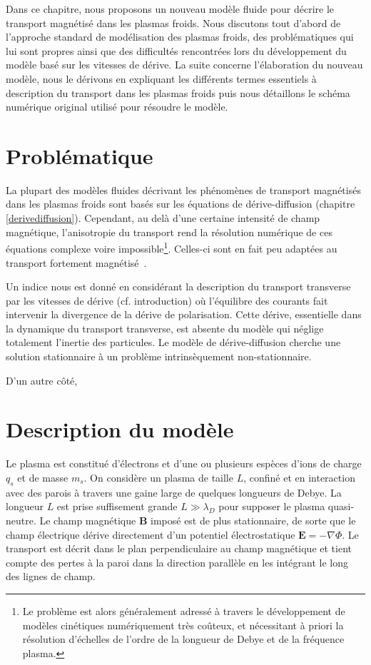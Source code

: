\begin{refsection}


Dans ce chapitre, nous proposons un nouveau modèle fluide pour décrire le
transport magnétisé dans les plasmas froids. Nous discutons tout d'abord de
l'approche standard de modélisation des plasmas froids, des problématiques qui
lui sont propres ainsi que des difficultés rencontrées lors du développement du
modèle basé sur les vitesses de dérive. La suite concerne l'élaboration du
nouveau modèle, nous le dérivons en expliquant les différents termes essentiels
à description du transport dans les plasmas froids puis nous détaillons le
schéma numérique original utilisé pour résoudre le modèle.
\section{Problématique}
La plupart des modèles fluides décrivant les phénomènes de transport magnétisés
dans les plasmas froids sont basés sur les équations de dérive-diffusion
(chapitre \ref{derivediffusion}). Cependant, au delà d'une certaine intensité de
champ magnétique, l'anisotropie du transport rend la résolution numérique de ces
équations complexe voire impossible\footnote{Le problème est alors généralement
adressé à travers le développement de modèles cinétiques numériquement très
coûteux, et nécessitant à priori la résolution d'échelles de l'ordre de la
longueur de Debye et de la fréquence plasma.}.
Celles-ci sont en fait peu adaptées au transport fortement
magnétisé~\cite{Golant}.


Un indice nous est donné en considérant la description du transport transverse
par les vitesses de dérive (cf.
introduction) où l'équilibre des courants fait intervenir la divergence de la
dérive de polarisation. Cette dérive, essentielle dans la dynamique du transport
transverse, est absente du modèle qui néglige totalement l'inertie des
particules. Le modèle de dérive-diffusion cherche une solution stationnaire à un
problème intrinsèquement non-stationnaire.

D'un autre côté,

\section{Description du modèle}
Le plasma est constitué d'électrons et d'une ou plusieurs espèces d'ions de
charge $q_s$ et de masse $m_s$. On considère un plasma de taille $L$, confiné et
en interaction avec des parois à travers une gaine large de quelques longueurs
de Debye. La longueur $L$ est prise suffisement grande $L\gg\lambda_D$ pour
supposer le plasma quasi-neutre. Le champ magnétique $\mathbf{B}$ imposé est de
plus stationnaire, de sorte que le champ électrique dérive directement d'un
potentiel électrostatique $\mathbf{E}=-\nabla \Phi$. Le transport est décrit
dans le plan perpendiculaire au champ magnétique et tient compte des pertes à la
paroi dans la direction parallèle en les intégrant le long des lignes de champ.


\end{refsection}
